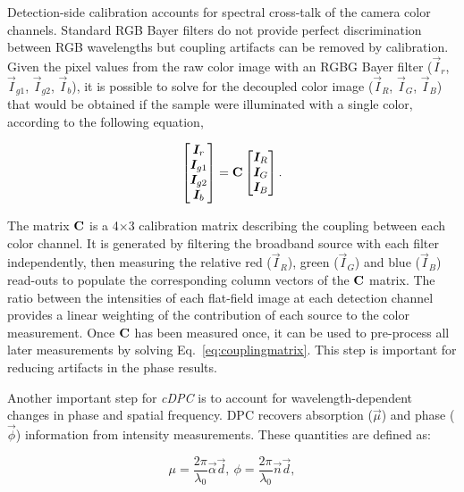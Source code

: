 Detection-side calibration accounts for spectral cross-talk of the camera color channels. Standard RGB Bayer filters do not provide perfect discrimination between RGB wavelengths but coupling artifacts can be removed by calibration. Given the pixel values from the raw color image with an RGBG Bayer filter ($\vec{I}_r$, $\vec{I}_{g1}$, $\vec{I}_{g2}$, $\vec{I}_b$), it is possible to solve for the decoupled color image ($\vec{I}_R$, $\vec{I}_{G}$, $\vec{I}_{B}$) that would be obtained if the sample were illuminated with a single color, according to the following equation,

\begin{equation}
\label{eq:couplingmatrix}
\begin{bmatrix}
\bm{I}_{r} \\
\bm{I}_{g1}\\
\bm{I}_{g2}\\
\bm{I}_{b}
\end{bmatrix}
 =
 \mathbf{C}
 \begin{bmatrix}
\bm{I}_{R} \\
\bm{I}_{G}\\
\bm{I}_{B}
\end{bmatrix}.
\end{equation}

\noindent  The matrix $\mathbf{C}$ is a 4$\times$3 calibration matrix describing the coupling between each color channel. It is generated by filtering the broadband source with each filter independently, then measuring the relative red ($\vec{I}_R$), green ($\vec{I}_G$) and blue ($\vec{I}_B$) read-outs to populate the corresponding column vectors of the $\mathbf{C}$ matrix. The ratio between the intensities of each flat-field image at each detection channel provides a linear weighting of the contribution of each source to the color measurement. Once $\mathbf{C}$ has been measured once, it can be used to pre-process all later measurements by solving Eq.~\eqref{eq:couplingmatrix}. This step is important for reducing artifacts in the phase results.

Another important step for \textit{cDPC} is to account for wavelength-dependent changes in phase and spatial frequency. DPC recovers absorption ($\vec{\mu}$) and phase ($\vec{\phi}$) information from intensity measurements. These quantities are defined as:

\begin{equation}
\label{eq:absorption_phase}
\mu = \frac{2\pi}{\lambda_0} \vec{\alpha} \vec{d},\ \phi = \frac{2\pi}{\lambda_0} \vec{n} \vec{d},
\end{equation}

